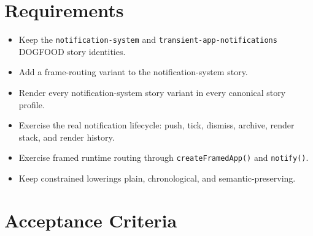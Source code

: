 \section{Requirements}\label{record-103-requirements}

\begin{itemize}
\tightlist
\item
  Keep the \texttt{n\allowbreak{}o\allowbreak{}t\allowbreak{}i\allowbreak{}f\allowbreak{}i\allowbreak{}c\allowbreak{}a\allowbreak{}t\allowbreak{}i\allowbreak{}o\allowbreak{}n\allowbreak{}-\allowbreak{}s\allowbreak{}y\allowbreak{}s\allowbreak{}t\allowbreak{}e\allowbreak{}m} and \texttt{t\allowbreak{}r\allowbreak{}a\allowbreak{}n\allowbreak{}s\allowbreak{}i\allowbreak{}e\allowbreak{}n\allowbreak{}t\allowbreak{}-\allowbreak{}a\allowbreak{}p\allowbreak{}p\allowbreak{}-\allowbreak{}n\allowbreak{}o\allowbreak{}t\allowbreak{}i\allowbreak{}f\allowbreak{}i\allowbreak{}c\allowbreak{}a\allowbreak{}t\allowbreak{}i\allowbreak{}o\allowbreak{}n\allowbreak{}s} DOGFOOD story identities.
\item
  Add a frame-routing variant to the notification-system story.
\item
  Render every notification-system story variant in every canonical story profile.
\item
  Exercise the real notification lifecycle: push, tick, dismiss, archive, render stack, and render history.
\item
  Exercise framed runtime routing through \texttt{c\allowbreak{}r\allowbreak{}e\allowbreak{}a\allowbreak{}t\allowbreak{}e\allowbreak{}F\allowbreak{}r\allowbreak{}a\allowbreak{}m\allowbreak{}e\allowbreak{}d\allowbreak{}A\allowbreak{}p\allowbreak{}p\allowbreak{}(\allowbreak{})} and \texttt{n\allowbreak{}o\allowbreak{}t\allowbreak{}i\allowbreak{}f\allowbreak{}y\allowbreak{}(\allowbreak{})}.
\item
  Keep constrained lowerings plain, chronological, and semantic-preserving.
\end{itemize}

\section{Acceptance Criteria}\label{record-103-acceptance-criteria}

